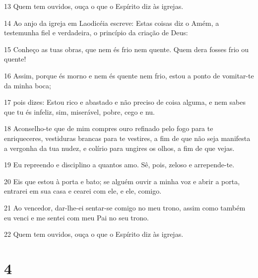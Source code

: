 \par 13 Quem tem ouvidos, ouça o que o Espírito diz às igrejas.
\par 14 Ao anjo da igreja em Laodicéia escreve: Estas coisas diz o Amém, a testemunha fiel e verdadeira, o princípio da criação de Deus:
\par 15 Conheço as tuas obras, que nem és frio nem quente. Quem dera fosses frio ou quente!
\par 16 Assim, porque és morno e nem és quente nem frio, estou a ponto de vomitar-te da minha boca;
\par 17 pois dizes: Estou rico e abastado e não preciso de coisa alguma, e nem sabes que tu és infeliz, sim, miserável, pobre, cego e nu.
\par 18 Aconselho-te que de mim compres ouro refinado pelo fogo para te enriqueceres, vestiduras brancas para te vestires, a fim de que não seja manifesta a vergonha da tua nudez, e colírio para ungires os olhos, a fim de que vejas.
\par 19 Eu repreendo e disciplino a quantos amo. Sê, pois, zeloso e arrepende-te.
\par 20 Eis que estou à porta e bato; se alguém ouvir a minha voz e abrir a porta, entrarei em sua casa e cearei com ele, e ele, comigo.
\par 21 Ao vencedor, dar-lhe-ei sentar-se comigo no meu trono, assim como também eu venci e me sentei com meu Pai no seu trono.
\par 22 Quem tem ouvidos, ouça o que o Espírito diz às igrejas.

\chapter{4}

